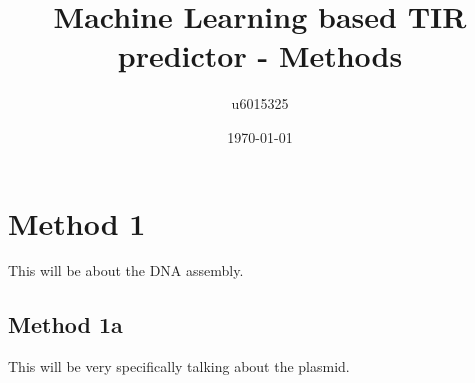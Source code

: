 \documentclass{article}
\title{Machine Learning based TIR predictor - Methods}
\author{u6015325 }
\date{\today{}}
\begin{document}
\maketitle

\section{Method 1}
This will be about the DNA assembly.\\
\subsection{Method 1a}
This will be very specifically talking about the plasmid.
\end{document}

